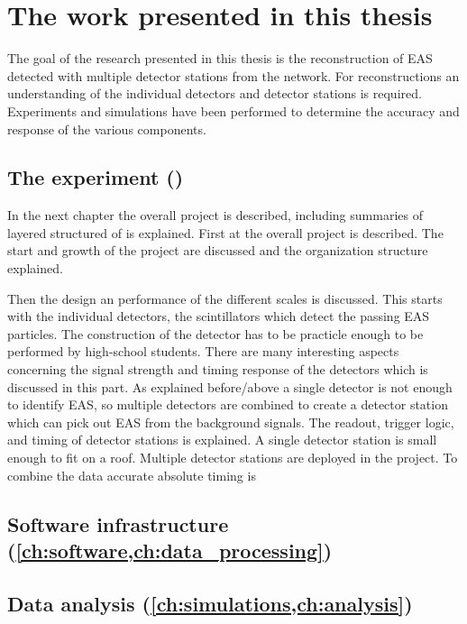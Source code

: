 \section{The work presented in this thesis}

The goal of the research presented in this thesis is the reconstruction of EAS detected with multiple detector stations from the \hisparc network. For reconstructions an understanding of the individual detectors and detector stations is required. Experiments and simulations have been performed to determine the accuracy and response of the various components.


\subsection{The \hisparc experiment
            ()}

In the next chapter the overall project is described, including summaries of layered structured of \hisparc is explained. First at the overall project is described. The start and growth of the project are discussed and the organization structure explained.

Then the design an performance of the different scales is discussed. This starts with the individual detectors, the scintillators which detect the passing EAS particles. The construction of the detector has to be practicle enough to be performed by high-school students. There are many interesting aspects concerning the signal strength and timing response of the detectors which is discussed in this part. As explained before/above a single detector is not enough to identify EAS, so multiple detectors are combined to create a detector station which can pick out EAS from the background signals. The readout, trigger logic, and timing of detector stations is explained. A single detector station is small enough to fit on a roof. Multiple detector stations are deployed in the \hisparc project. To combine the data accurate absolute timing is 


\subsection{Software infrastructure
            (\cref{ch:software,ch:data_processing})}



\subsection{Data analysis
            (\cref{ch:simulations,ch:analysis})}




